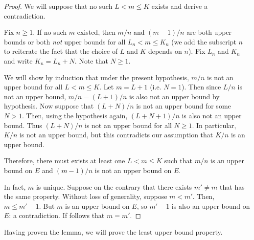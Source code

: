 \documentclass{article}
\begin{document}
\begin{proof}
We will suppose that no such $L < m \leq K$ exists and derive a contradiction. 

Fix $n \geq 1$. If no such $m$ existed, then $m/n$ and $(m-1)/n$ are both upper bounds or both \textit{not} upper bounds for all $L_n < m \leq K_n$ (we add the subscript $n$ to reiterate the fact that the choice of $L$ and $K$ depends on $n$). Fix $L_n$ and $K_n$ and write $K_n = L_n + N$. Note that $N \geq 1$.

We will show by induction that under the present hypothesis, $m/n$ is not an upper bound for all $L < m \leq K$. Let $m = L + 1$ (i.e. $N = 1$). Then since $L/n$ is not an upper bound, $m/n = (L+1)/n$ is also not an upper bound by hypothesis. Now suppose that $(L+N)/n$ is not an upper bound for some $N > 1$. Then, using the hypothesis again, $(L + N+ 1)/n$ is also not an upper bound. Thus $(L + N)/n$ is not an upper bound for all $N \geq 1$. In particular, $K/n$ is not an upper bound, but this contradicts our assumption that $K/n$ is an upper bound.

Therefore, there must exists at least one $L < m \leq K$ such that $m/n$ is an upper bound on $E$ and $(m-1)/n$ is not an upper bound on $E$.

In fact, $m$ is unique. Suppose on the contrary that there exists $m' \neq m$ that has the same property. Without loss of generality, suppose $m < m'$. Then, $m \leq m' - 1$. But $m$ is an upper bound on $E$, so $m' - 1$ is also an upper bound on $E$: a contradiction. If follows that $m = m'$. 
\end{proof}

Having proven the lemma, we will prove the least upper bound property.
\end{document}

